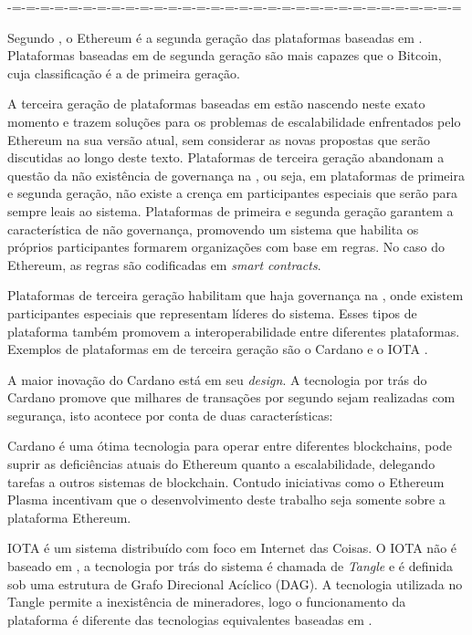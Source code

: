 \documentclass[tcc,capa]{texufpel}
\begin{document}
    
    -=-=-=-=-=-=-=-=-=-=-=-=-=-=-=-=-=-=-=-=-=-=-=-=-=-=-=-=-=-=-=-=
    
    Segundo \cite{spurjeonsurvey}, o Ethereum é a segunda geração das plataformas baseadas em \bchain. Plataformas baseadas em \bchain de segunda geração são mais capazes que o Bitcoin, cuja classificação é a de primeira geração. 
    
    A terceira geração de plataformas baseadas em \bchain estão nascendo neste exato momento e trazem soluções para os problemas de escalabilidade enfrentados pelo Ethereum na sua versão atual, sem considerar as novas propostas que serão discutidas ao longo deste texto. Plataformas de terceira geração abandonam a questão da não existência de governança na \bchain, ou seja, em plataformas de primeira e segunda geração, não existe a crença em participantes especiais que serão para sempre leais ao sistema. Plataformas de primeira e segunda geração garantem a característica de não governança, promovendo um sistema que habilita os próprios participantes formarem organizações com base em regras. No caso do Ethereum, as regras são codificadas em \textit{smart contracts}.
    
    Plataformas de terceira geração habilitam que haja governança na \bchain, onde existem participantes especiais que representam líderes do sistema. Esses tipos de plataforma também promovem a interoperabilidade entre diferentes plataformas. Exemplos de plataformas em \bchain de terceira geração são o Cardano e o IOTA \cite{spurjeonsurvey}.
    
    A maior inovação do Cardano está em seu \textit{design}. A tecnologia por trás do Cardano promove que milhares de transações por segundo sejam realizadas com segurança, isto acontece por conta de duas características:
    
    Cardano é uma ótima tecnologia para operar entre diferentes blockchains, pode suprir as deficiências atuais do Ethereum quanto a escalabilidade, delegando tarefas a outros sistemas de blockchain. Contudo iniciativas como o Ethereum Plasma incentivam que o desenvolvimento deste trabalho seja somente sobre a plataforma Ethereum.
    
    IOTA é um sistema distribuído com foco em Internet das Coisas. O IOTA não é baseado em \bchain, a tecnologia por trás do sistema é chamada de \textit{Tangle} e é definida sob uma estrutura de Grafo Direcional Acíclico (DAG). A tecnologia utilizada no Tangle permite a inexistência de mineradores, logo o funcionamento da plataforma é diferente das tecnologias equivalentes baseadas em \bchain.
    
\end{document}
